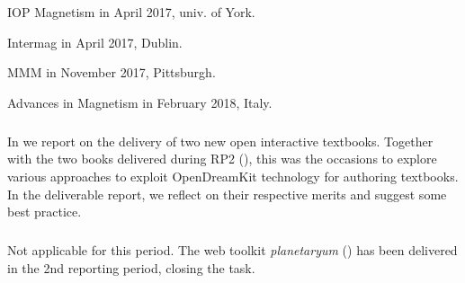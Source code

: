 \begin{compactitem}
\item IOP Magnetism in April 2017, univ. of York.
\item Intermag in April 2017, Dublin.
\item MMM in November 2017, Pittsburgh.
\item Advances in Magnetism in February 2018, Italy.
\end{compactitem}

\subparagraph{}
\label{dissem@ibook}

In  we report on the delivery of two new
open interactive textbooks. Together with the two books delivered
during RP2 (), this was the occasions to
explore various approaches to exploit OpenDreamKit technology for
authoring textbooks. In the deliverable report, we reflect on their
respective merits and suggest some best practice.

\subparagraph{} Not
applicable for this period.  The web toolkit \textit{planetaryum}
() has been delivered in the 2nd reporting
period, closing the task.

  

